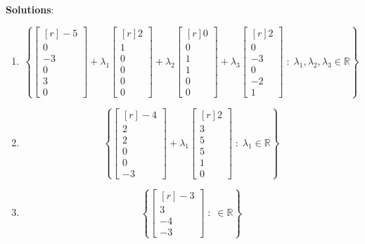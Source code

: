 \documentclass[12pt]{article}
\begin{document}
\clearpage
\textbf{Solutions}:
\begin{enumerate}
\item\[\left\{\begin{bmatrix*}[r]-5\\0\\-3\\0\\3\\0\end{bmatrix*}
+\lambda_{1}\begin{bmatrix*}[r]2\\1\\0\\0\\0\\0\end{bmatrix*}
+\lambda_{2}\begin{bmatrix*}[r]0\\0\\1\\1\\0\\0\end{bmatrix*}
+\lambda_{3}\begin{bmatrix*}[r]2\\0\\-3\\0\\-2\\1\end{bmatrix*}
\;:\;\lambda_{1},\lambda_{2},\lambda_{3}\in\mathbb{R}\right\}
\]
\item\[\left\{\begin{bmatrix*}[r]-4\\2\\2\\0\\0\\-3\end{bmatrix*}
+\lambda_{1}\begin{bmatrix*}[r]2\\3\\5\\5\\1\\0\end{bmatrix*}
\;:\;\lambda_{1}\in\mathbb{R}\right\}
\]
\item\[\left\{\begin{bmatrix*}[r]-3\\3\\-4\\-3\end{bmatrix*}
\;:\;\in\mathbb{R}\right\}
\]


\end{enumerate}
\end{document}
